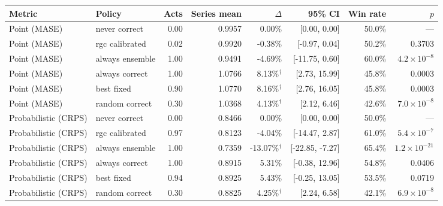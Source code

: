 \begin{tabular}{llrrrrrr}
\toprule
Metric & Policy & Acts & Series mean & $\Delta$ & 95\% CI & Win rate & $p$ \\
\midrule
Point (MASE) & never correct & 0.00 & 0.9957 & 0.00\% & [0.00, 0.00] & 50.0\% & --- \\
Point (MASE) & rgc calibrated & 0.02 & 0.9920 & -0.38\% & [-0.97, 0.04] & 50.2\% & 0.3703 \\
Point (MASE) & always ensemble & 1.00 & 0.9491 & -4.69\% & [-11.75, 0.60] & 60.0\% & $4.2 \times 10^{-8}$ \\
Point (MASE) & always correct & 1.00 & 1.0766 & 8.13\%$^\dagger$ & [2.73, 15.99] & 45.8\% & 0.0003 \\
Point (MASE) & best fixed & 0.90 & 1.0770 & 8.16\%$^\dagger$ & [2.76, 16.05] & 45.8\% & 0.0003 \\
Point (MASE) & random correct & 0.30 & 1.0368 & 4.13\%$^\dagger$ & [2.12, 6.46] & 42.6\% & $7.0 \times 10^{-8}$ \\
Probabilistic (CRPS) & never correct & 0.00 & 0.8466 & 0.00\% & [0.00, 0.00] & 50.0\% & --- \\
Probabilistic (CRPS) & rgc calibrated & 0.97 & 0.8123 & -4.04\% & [-14.47, 2.87] & 61.0\% & $5.4 \times 10^{-7}$ \\
Probabilistic (CRPS) & always ensemble & 1.00 & 0.7359 & -13.07\%$^\dagger$ & [-22.85, -7.27] & 65.4\% & $1.2 \times 10^{-21}$ \\
Probabilistic (CRPS) & always correct & 1.00 & 0.8915 & 5.31\% & [-0.38, 12.96] & 54.8\% & 0.0406 \\
Probabilistic (CRPS) & best fixed & 0.94 & 0.8925 & 5.43\% & [-0.25, 13.05] & 53.5\% & 0.0719 \\
Probabilistic (CRPS) & random correct & 0.30 & 0.8825 & 4.25\%$^\dagger$ & [2.24, 6.58] & 42.1\% & $6.9 \times 10^{-8}$ \\
\bottomrule
\end{tabular}
